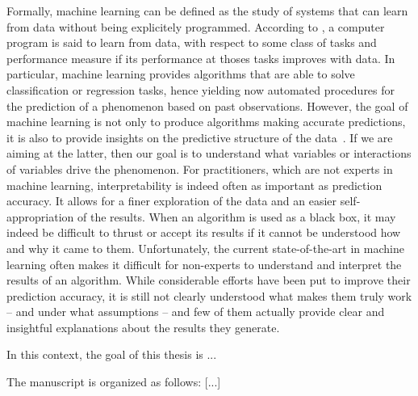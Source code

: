 Formally, machine learning can be defined as the study of systems that can
learn from data without being explicitely programmed. According to
\citet{mitchell:1997}, a computer program is said to learn from data, with
respect to some class of tasks and performance measure if its performance at
thoses tasks improves with data. In particular, machine learning provides
algorithms that are able to solve classification or regression tasks, hence
yielding now automated procedures for the prediction of a phenomenon based on
past observations. However, the goal of machine learning is not only to produce
algorithms making accurate predictions, it is also to provide insights on the
predictive structure of the data~\citep{breiman:1984}. If we are aiming at the
latter, then our goal is to understand what variables or interactions of
variables drive the phenomenon. For practitioners, which are not experts in
machine learning, interpretability is indeed often as important as prediction
accuracy. It allows for a finer exploration of the data and an easier self-appropriation
of the results. When an algorithm is used as a black box, it may
indeed be difficult to thrust or accept its results if it cannot be understood
how and why it came to them. Unfortunately, the current state-of-the-art in
machine learning often makes it difficult for non-experts to understand and
interpret the results of an algorithm. While considerable efforts have been put
to improve their prediction accuracy, it is still not clearly understood what
makes them truly work -- and under what assumptions -- and few of them actually
provide clear and insightful explanations about the results they generate.

In this context, the goal of this thesis is ...

The manuscript is organized as follows: [...]






